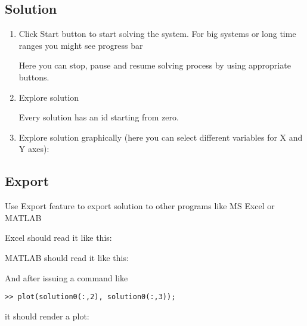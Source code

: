 \documentclass[12pt]{article}
\begin{document}
\subsection{Solution}

\begin{enumerate}

\item Click Start button  to start solving the system.
For big systems or long time ranges you might see progress bar


Here you can stop, pause and resume solving process by using appropriate buttons.

\item Explore solution


Every solution has an id starting from zero.

\item Explore solution graphically (here you can select different 
variables for X and Y axes):


\end{enumerate}

\subsection{Export}

Use Export feature to export solution to other programs like MS Excel or MATLAB


Excel should read it like this:


MATLAB should read it like this:


And after issuing a command like

\texttt{>{}> plot(solution0(:,2), solution0(:,3));}

it should render a plot:




\end{document}

